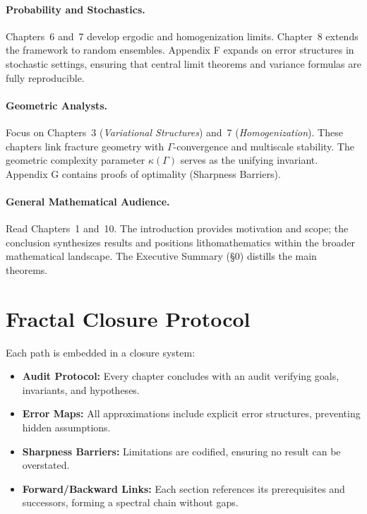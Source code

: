 \paragraph{Probability and Stochastics.}
Chapters~6 and~7 develop ergodic and homogenization limits. Chapter~8 extends 
the framework to random ensembles. Appendix F expands on error structures 
in stochastic settings, ensuring that central limit theorems and variance 
formulas are fully reproducible.

\paragraph{Geometric Analysts.}
Focus on Chapters~3 (\emph{Variational Structures}) and~7 (\emph{Homogenization}). 
These chapters link fracture geometry with $\Gamma$-convergence and 
multiscale stability. The geometric complexity parameter $\kappa(\Gamma)$ 
serves as the unifying invariant. Appendix G contains proofs of optimality 
(Sharpness Barriers).

\paragraph{General Mathematical Audience.}
Read Chapters~1 and~10. The introduction provides motivation and scope; 
the conclusion synthesizes results and positions lithomathematics within 
the broader mathematical landscape. The Executive Summary (\S0) distills 
the main theorems.

\section*{Fractal Closure Protocol}

Each path is embedded in a closure system:
\begin{itemize}
    \item \textbf{Audit Protocol:} Every chapter concludes with an audit 
    verifying goals, invariants, and hypotheses.
    \item \textbf{Error Maps:} All approximations include explicit error 
    structures, preventing hidden assumptions.
    \item \textbf{Sharpness Barriers:} Limitations are codified, ensuring 
    no result can be overstated.
    \item \textbf{Forward/Backward Links:} Each section references its 
    prerequisites and successors, forming a spectral chain without gaps.
\end{itemize}

